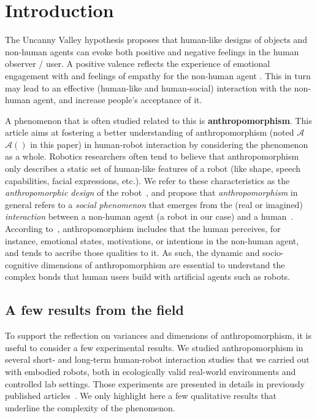 \documentclass{frontiersSCNS} %
\newcommand{\Ant}[1][]{%
      \ifthenelse{\isempty{#1}}%
        {$\mathcal{A}$}
        {$\mathcal{A}(#1)$}
}
\begin{document}
%
%
%
%
%
%


\section{Introduction}
\label{sec:intro}

The Uncanny Valley hypothesis \citep{mori_uncanny_1970} proposes that human-like
designs of objects and non-human agents can evoke both positive and negative
feelings in the human observer / user. A positive valence reflects the
experience of emotional engagement with and feelings of empathy for the
non-human agent \citep{cheetham_human_2011}. This in turn may lead to an
effective (human-like and human-social) interaction with the non-human agent,
and increase people's acceptance of it. 

A phenomenon that is often studied related to this is \textbf{anthropomorphism}.
This article aims at fostering a better understanding of
anthropomorphism (noted \Ant in this paper) in human-robot interaction by
considering the phenomenon as a whole. Robotics researchers often tend to
believe that anthropomorphism only describes a static set of human-like features
of a robot (like shape, speech capabilities, facial expressions, etc.). We refer
to these characteristics as the \emph{anthropomorphic design} of the
robot~\citep{fink_anthropomorphism_2012}, and propose that
\emph{anthropomorphism} in general refers to a \emph{social phenomenon} that
emerges from the (real or imagined) \emph{interaction} between a non-human agent
(a robot in our case) and a human~\citep{persson_anthropomorphism_2000}. According
to~\cite{epley_when_2008}, anthropomorphism includes that the human perceives,
for instance, emotional states, motivations, or intentions in the non-human
agent, and tends to ascribe those qualities to it.  As such, the dynamic and
socio-cognitive dimensions of anthropomorphism are essential to understand the
complex bonds that human users build with artificial agents such as robots.


\subsection{A few results from the field}
\label{sec:field-results}

To support the reflection on variances and dimensions of anthropomorphism, it is 
useful to consider a few experimental
results. We studied anthropomorphism in several short- and long-term
human-robot interaction studies that we carried out with embodied robots, both
in ecologically valid real-world environments and controlled lab settings. Those
experiments are presented in details in previously published
articles~\citep{fink_anthropomorphic_2012, fink_living_2013, fink2014which,
lemaignan2014dynamics}. We only highlight here a few qualitative results that
underline the complexity of the phenomenon.
\end{document}
